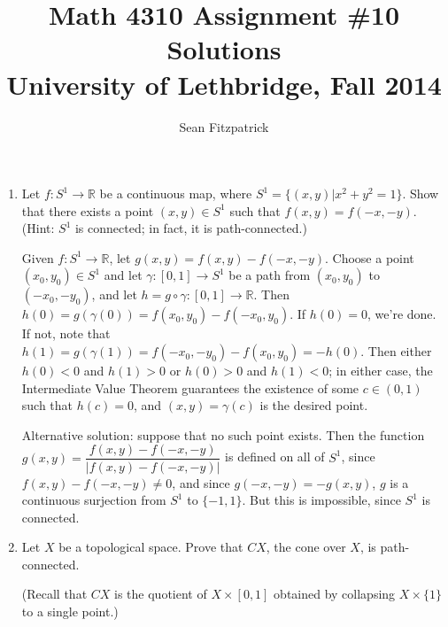 \documentclass[letterpaper,12pt]{article}
\title{Math 4310 Assignment \#10 Solutions\\University of Lethbridge, Fall 2014}
\author{Sean Fitzpatrick}
\newcommand{\abs}[1]{\lvert #1\rvert}
\newcommand{\R}{\mathbb{R}}
\begin{document}
 \maketitle


\begin{enumerate}
\item Let $f:S^1\to \R$ be a continuous map, where $S^1=\{(x,y) | x^2+y^2=1\}$. Show that there exists a point $(x,y)\in S^1$ such that $f(x,y)=f(-x,-y)$. (Hint: $S^1$ is connected; in fact, it is path-connected.)

\bigskip

Given $f:S^1\to\R$, let $g(x,y)=f(x,y)-f(-x,-y)$. Choose a point $(x_0,y_0)\in S^1$ and let $\gamma:[0,1]\to S^1$ be a path from $(x_0,y_0)$ to $(-x_0,-y_0)$, and let $h=g\circ\gamma:[0,1]\to \R$. Then $h(0)=g(\gamma(0))=f(x_0,y_0)-f(-x_0,y_0)$. If $h(0)=0$, we're done. If not, note that $h(1)=g(\gamma(1))=f(-x_0,-y_0)-f(x_0,y_0)=-h(0)$. Then either $h(0)<0$ and $h(1)>0$ or $h(0)>0$ and $h(1)<0$; in either case, the Intermediate Value Theorem guarantees the existence of some $c\in (0,1)$ such that $h(c)=0$, and $(x,y)=\gamma(c)$ is the desired point.

\bigskip

Alternative solution: suppose that no such point exists. Then the function $g(x,y) = \dfrac{f(x,y)-f(-x,-y)}{\abs{f(x,y)-f(-x,-y)}}$ is defined on all of $S^1$, since $f(x,y)-f(-x,-y)\neq 0$, and since $g(-x,-y)=-g(x,y)$, $g$ is a continuous surjection from $S^1$ to $\{-1,1\}$. But this is impossible, since $S^1$ is connected.

\bigskip

\item Let $X$ be a topological space. Prove that $CX$, the cone over $X$, is path-connected.

(Recall that $CX$ is the quotient of $X\times [0,1]$ obtained by collapsing $X\times\{1\}$ to a single point.)

\bigskip


\end{enumerate}
\end{document}
